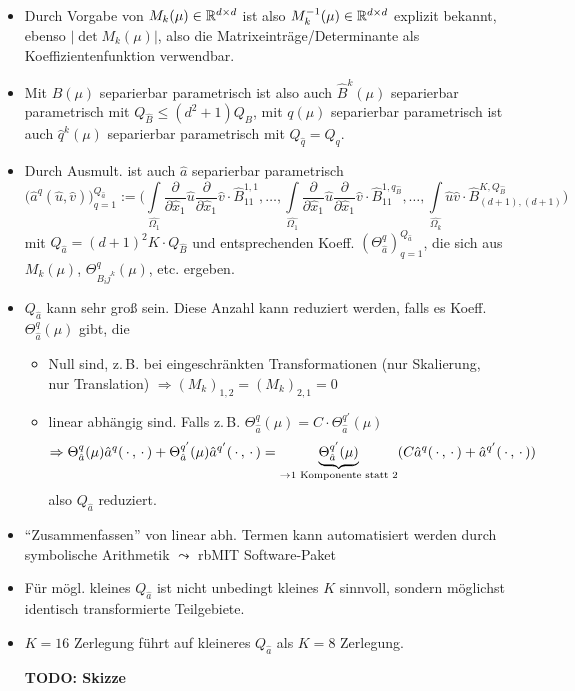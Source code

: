\begin{bem} \beginwithlistbem
	\begin{itemize}
		\item Durch Vorgabe von $M_k(\mu) \in \mathbb{R}^{d \times d}$ ist also $M_k^{-1} (\mu) \in \mathbb{R}^{d \times d}$ explizit bekannt, ebenso $|\det M_k(\mu)|$, also die Matrixeinträge/Determinante als Koeffizientenfunktion verwendbar.
		\item Mit  $B(\mu)$ separierbar parametrisch ist also auch $\hat{B}^k (\mu)$ separierbar parametrisch mit $Q_{\hat{B}} \leq (d^2 +1)Q_B$, mit $q(\mu)$ separierbar parametrisch ist auch $\hat{q}^k (\mu)$ separierbar parametrisch mit $Q_{\hat{q}} = Q_q$.
		\item Durch Ausmult. ist auch $\hat{a}$ separierbar parametrisch
		\[
			\big( \hat{a}^q(\hat{u},\hat{v}) \big)_{q=1}^{Q_{\hat{a}}} := \big( \int\limits_{\hat{\Omega_1}} \frac{\partial}{\partial \hat{x}_1} \hat{u} \frac{\partial}{\partial\hat{x}_1} \hat{v} \cdot \hat{B}_{1 1}^{1,1} , \dots , \int\limits_{\hat{\Omega_1}} \frac{\partial}{\partial \hat{x}_1} \hat{u} \frac{\partial}{\partial\hat{x}_1} \hat{v} \cdot \hat{B}_{1 1}^{1,q_{\hat{B}}} , \dots , \int\limits_{\hat{\Omega_k}} \hat{u} \hat{v} \cdot \hat{B}_{(d+1), (d+1)}^{K,Q_{\hat{B}}}  \big)
		\]
		mit $Q_{\hat{a}} = (d+1)^2 K \cdot Q_{\hat{B}}$ und entsprechenden Koeff. $\left( \Theta_{\hat{a}}^q \right)_{q=1}^{Q_{\hat{a}}}$, die sich aus $M_k(\mu)$, $\Theta_{B_ij^k}^q (\mu)$, etc. ergeben.
		\item $Q_{\hat{a}}$ kann sehr groß sein. Diese Anzahl kann reduziert werden, falls es Koeff. $\Theta _{\hat{a}}^q (\mu)$ gibt, die
		\begin{itemize}
			\item Null sind, z.\,B. bei eingeschränkten Transformationen (nur Skalierung, nur Translation) $\Rightarrow (M_k)_{1,2} = (M_k)_{2,1} = 0$
			\item linear abhängig sind. Falls z.\,B. $\Theta_{\hat{a}}^q (\mu) = C \cdot \Theta_{\hat{a}}^{q'} (\mu)$
			\[
				\Rightarrow \Theta_{\hat{a}}^q (\mu) \hat{a}^q (\,\cdot\,,\,\cdot\,) + \Theta_{\hat{a}}^{q'} (\mu) \hat{a}^{q'} (\,\cdot\,,\,\cdot\,) = \underbrace{\Theta_{\hat{a}}^{q'} (\mu)}_{\rightarrow \text{1 Komponente statt 2}} ( C \hat{a}^q(\,\cdot\,,\,\cdot\,) + \hat{a}^{q'} (\,\cdot\,,\,\cdot\,) )
			\]
			also $Q_{\hat{a}}$ reduziert.
		\end{itemize}
		\item ``Zusammenfassen'' von linear abh. Termen kann automatisiert werden durch symbolische Arithmetik $\leadsto$ rbMIT Software-Paket
		\item Für mögl. kleines $Q_{\hat{a}}$ ist nicht unbedingt kleines $K$ sinnvoll, sondern möglichst identisch transformierte Teilgebiete.
		\item $K=16$ Zerlegung führt auf kleineres $Q_{\hat{a}}$ als $K=8$ Zerlegung.
		
		{\large\bf TODO: Skizze}
	\end{itemize}
\end{bem}

